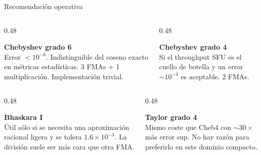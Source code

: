 \documentclass[aspectratio=169,10pt]{beamer}
\begin{document}
\begin{frame}{Recomendación operativa}
  \begin{columns}[T]
    \begin{column}{0.48\textwidth}
      \begin{tcolorbox}[colback=LTeal, colframe=Teal,
        title={\scriptsize\bfseries\color{white} Adoptar},
        fontupper=\footnotesize]
        \textbf{Chebyshev grado 6} \\
        Error $<10^{-6}$. Indistinguible del coseno exacto en métricas
        estadísticas. 3 FMAs $+$ 1 multiplicación. Implementación trivial.
      \end{tcolorbox}
    \end{column}
    \begin{column}{0.48\textwidth}
      \begin{tcolorbox}[colback=LPurple, colframe=Purple,
        title={\scriptsize\bfseries\color{white} Plan B (perfil reducido)},
        fontupper=\footnotesize]
        \textbf{Chebyshev grado 4} \\
        Si el throughput SFU es el cuello de botella y un error
        $\sim 10^{-4}$ es aceptable. 2 FMAs.
      \end{tcolorbox}
    \end{column}
  \end{columns}

  \vspace{6pt}

  \begin{columns}[T]
    \begin{column}{0.48\textwidth}
      \begin{tcolorbox}[colback=GrayLt, colframe=GrayMid,
        title={\scriptsize\bfseries Reservar},
        fontupper=\footnotesize]
        \textbf{Bhaskara I} \\
        Útil sólo si se necesita una aproximación racional ligera y se
        tolera $1.6\!\times\!10^{-3}$. La división suele ser más cara que
        otra FMA.
      \end{tcolorbox}
    \end{column}
    \begin{column}{0.48\textwidth}
      \begin{tcolorbox}[colback=LCoral, colframe=Coral,
        title={\scriptsize\bfseries\color{white} Descartar},
        fontupper=\footnotesize]
        \textbf{Taylor grado 4} \\
        Mismo coste que Cheb4 con $\sim 30\times$ más error sup.
        No hay razón para preferirlo en este dominio compacto.
      \end{tcolorbox}
    \end{column}
  \end{columns}


\end{frame}
\end{document}
